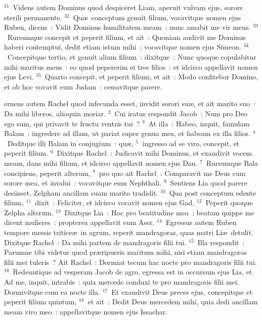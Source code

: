 ${}^{31}$~Videns autem Dominus quod despiceret Liam, aperuit vulvam ejus, sorore sterili permanente.
${}^{32}$~Qu\ae\ conceptum genuit filium, vocavitque nomen ejus Ruben, dicens~: Vidit Dominus humilitatem meam~: nunc amabit me vir meus.
${}^{33}$~Rursumque concepit et peperit filium, et ait~: Quoniam audivit me Dominus haberi contemptui, dedit etiam istum mihi~; vocavitque nomen ejus Simeon.
${}^{34}$~Concepitque tertio, et genuit alium filium~: dixitque~: Nunc quoque copulabitur mihi maritus meus~: eo quod pepererim ei tres filios~: et idcirco appellavit nomen ejus Levi.
${}^{35}$~Quarto concepit, et peperit filium, et ait~: Modo confitebor Domino, et ob hoc vocavit eum Judam~: cessavitque parere.

\bchapter
{}ernens autem Rachel quod infecunda esset, invidit sorori su\ae , et ait marito suo~: Da mihi liberos, alioquin moriar.
${}^{2}$~Cui iratus respondit Jacob~: Num pro Deo ego sum, qui privavit te fructu ventris tui~?
${}^{3}$~At illa~: Habeo, inquit, famulam Balam~: ingredere ad illam, ut pariat super genua mea, et habeam ex illa filios.
${}^{4}$~Deditque illi Balam in conjugium~: qu\ae ,
${}^{5}$~ingresso ad se viro, concepit, et peperit filium.
${}^{6}$~Dixitque Rachel~: Judicavit mihi Dominus, et exaudivit vocem meam, dans mihi filium, et idcirco appellavit nomen ejus Dan.
${}^{7}$~Rursumque Bala concipiens, peperit alterum,
${}^{8}$~pro quo ait Rachel~: Comparavit me Deus cum sorore mea, et invalui~: vocavitque eum Nephthali.
${}^{9}$~Sentiens Lia quod parere desiisset, Zelpham ancillam suam marito tradidit.
${}^{10}$~Qua post conceptum edente filium,
${}^{11}$~dixit~: Feliciter, et idcirco vocavit nomen ejus Gad.
${}^{12}$~Peperit quoque Zelpha alterum.
${}^{13}$~Dixitque Lia~: Hoc pro beatitudine mea~: beatam quippe me dicent mulieres~: propterea appellavit eum Aser.
${}^{14}$~Egressus autem Ruben tempore messis tritice\ae\ in agrum, reperit mandragoras, quas matri Li\ae\ detulit. Dixitque Rachel~: Da mihi partem de mandragoris filii tui.
${}^{15}$~Illa respondit~: Parumne tibi videtur quod pr\ae ripueris maritum mihi, nisi etiam mandragoras filii mei tuleris~? Ait Rachel~: Dormiat tecum hac nocte pro mandragoris filii tui.
${}^{16}$~Redeuntique ad vesperam Jacob de agro, egressa est in occursum ejus Lia, et Ad me, inquit, intrabis~: quia mercede conduxi te pro mandragoris filii mei. Dormivitque cum ea nocte illa.
${}^{17}$~Et exaudivit Deus preces ejus, concepitque et peperit filium quintum,
${}^{18}$~et ait~: Dedit Deus mercedem mihi, quia dedi ancillam meam viro meo~: appellavitque nomen ejus Issachar.
